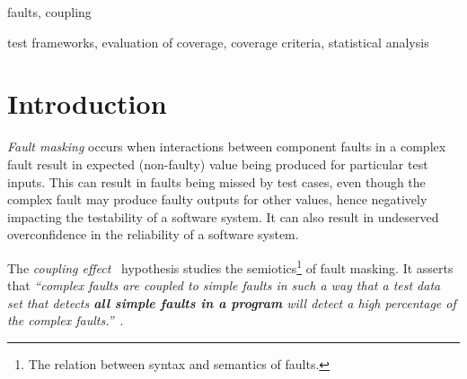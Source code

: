 \documentclass[preprint,nonatbib]{sigplanconf}\usepackage[]{graphicx}\usepackage[]{color}
\begin{document}

\begin{comment}
\begin{CCSXML}
  <ccs2012>
  <concept>
  <concept_id>10011007.10011074.10011099.10011693</concept_id>
  <concept_desc>Software and its engineering~Empirical software validation</concept_desc>
  <concept_significance>500</concept_significance>
  </concept>
  </ccs2012>
\end{CCSXML}

\ccsdesc[500]{Software and its engineering~Empirical software validation}
\end{comment}

\terms
faults, coupling

\keywords
test frameworks, evaluation of coverage, coverage criteria, statistical analysis


\begin{comment}

\end{comment}


\setlength\tabcolsep{2pt}



\section{Introduction}

\emph{Fault masking} occurs when interactions between component faults in
a complex fault result in expected (non-faulty) value being produced for
particular test inputs. This can result in faults being missed by test cases,
even though the complex fault may produce faulty outputs for other values, hence
negatively impacting the testability of a software system.
It can also result in undeserved overconfidence in the reliability of a software
system.

The \emph{coupling effect}~\cite{demillo1978hints} hypothesis studies the
semiotics\footnote{The relation between syntax and semantics of faults.} of fault masking. It asserts that
\emph{``complex faults are coupled to simple faults in such a way that a test
data set that detects \textbf{all simple faults in a program} will detect a
high percentage of the complex faults.''}~\cite{offutt1992investigations,offutt1989thecoupling, jia2011analysis}.
\end{document}
